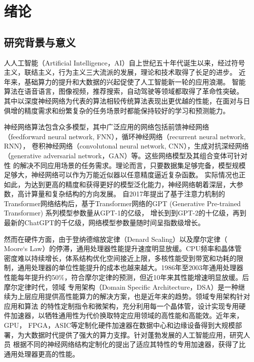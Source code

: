 \chapter{绪\hspace{6pt}论}

\section{研究背景与意义}
人人工智能（Artificial Intelligence，AI）自上世纪五十年代诞生以来，经过符号主义，联结主义，行为主义三大流派的发展，理论和技术取得了长足的进步。
近年来，基础算力的提升和大数据的兴起促使了人工智能新一轮的应用浪潮。
智能算法在语音语言，图像视频，推荐搜索，自动驾驶等领域都取得了革命性突破。
其中以深度神经网络为代表的算法相较传统算法表现出更优越的性能，在面对与日俱增的精度需求和纷繁复杂的任务场景时都能保持较好的学习和预测能力。

神经网络算法包含众多模型，其中广泛应用的网络包括前馈神经网络（feedforward neural network, FNN），循环神经网络（recurrent neural network, RNN），
卷积神经网络（convolutonal neural network, CNN），生成对抗深经网络（generative adversarial network，GAN）等。这些网络模型及其组合变体可针对性
的解决不同应用场景的任务需求。理论而言，只要数据集足够完备，模型规模足够大，神经网络可以作为万能近似器以任意精度逼近复杂函数。
实际情况也正如此，为达到更高的精度和获得更好的模型泛化能力，神经网络朝着深层，大参数，高计算量和复杂结构的方向发展。
自2017年提出了基于注意力机制的Transformer网络结构后，基于Transformer网络的GPT (Generative Pre-trained Transformer) 系列模型参数量从GPT-1的亿级，
增长到到GPT-2的十亿级，再到最新的ChatGPT的千亿级，网络模型参数量随时间呈指数级增长。

然而在硬件方面，由于登纳德缩放定律（Denard Scaling）以及摩尔定律（ Moore‘s Law）的停滞，通用处理器性能提升速度明显放缓。CPU频率和晶体管
密度难以持续增长，体系结构优化空间接近上限，多核性能受到带宽和功耗的限制，通用处理器的单位性能提升的成本也越来越大。1986年至2003年通用处理器
性能每年提升约50\%，符合摩尔定律的预测，但近10年来其性能增速明显放缓。后摩尔定律时代，领域
专用架构（Domain Specific Architecture，DSA）是一种继续为上层应用提供高性能算力的解决方案，也是近年来的趋势。领域专用架构针对应用和算法
的特性定制指令和微架构，充分利用每一个晶体管，设计实现专用硬件加速器，以牺牲通用性为代价换取特定应用领域的高性能和高能效。近年来，GPU，
FPGA，ASIC等定制化硬件加速器在数据中心和边缘设备得到大规模部署，为大数据时代提供了强大的算力支撑。针对蓬勃发展的人工智能应用，研究人员
根据不同的神经网络结构定制化的提出了适应其特性的专用加速器，获得了比通用处理器更高的性能。

